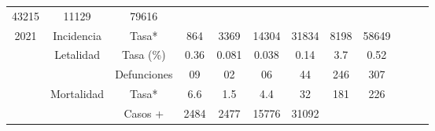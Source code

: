 \begin{tabular}{ccc|cccccc|lll}
		\multicolumn{1}{c|}{\cellcolor[HTML]{FFFC9E}43215} &
		\multicolumn{1}{c|}{\cellcolor[HTML]{FFFC9E}11129} &
		\cellcolor[HTML]{FFFC9E}79616 &
		&
		&
		\\ \cline{2-9}
		\multicolumn{1}{|c|}{\multirow{-5}{*}{\cellcolor[HTML]{FFFC9E}2021}} &
		\multicolumn{1}{c|}{\cellcolor[HTML]{FFFC9E}Incidencia} &
		\cellcolor[HTML]{FFFC9E}Tasa* &
		\multicolumn{1}{c|}{\cellcolor[HTML]{FFFC9E}864} &
		\multicolumn{1}{c|}{\cellcolor[HTML]{FFFC9E}3369} &
		\multicolumn{1}{c|}{\cellcolor[HTML]{FFFC9E}14304} &
		\multicolumn{1}{c|}{\cellcolor[HTML]{FFFC9E}31834} &
		\multicolumn{1}{c|}{\cellcolor[HTML]{FFFC9E}8198} &
		\cellcolor[HTML]{FFFC9E}58649 &
		&
		&
		\\ \cline{1-9}
		\multicolumn{1}{|c|}{\cellcolor[HTML]{C1EFC0}} &
		\multicolumn{1}{c|}{\cellcolor[HTML]{C1EFC0}Letalidad} &
		\cellcolor[HTML]{C1EFC0}Tasa (\%) &
		\multicolumn{1}{c|}{\cellcolor[HTML]{C1EFC0}0.36} &
		\multicolumn{1}{c|}{\cellcolor[HTML]{C1EFC0}0.081} &
		\multicolumn{1}{c|}{\cellcolor[HTML]{C1EFC0}0.038} &
		\multicolumn{1}{c|}{\cellcolor[HTML]{C1EFC0}0.14} &
		\multicolumn{1}{c|}{\cellcolor[HTML]{C1EFC0}3.7} &
		\cellcolor[HTML]{C1EFC0}0.52 &
		&
		&
		\\ \cline{3-9}
		\multicolumn{1}{|c|}{\cellcolor[HTML]{C1EFC0}} &
		\multicolumn{1}{c|}{\cellcolor[HTML]{C1EFC0}} &
		\cellcolor[HTML]{C1EFC0}Defunciones &
		\multicolumn{1}{c|}{\cellcolor[HTML]{C1EFC0}09} &
		\multicolumn{1}{c|}{\cellcolor[HTML]{C1EFC0}02} &
		\multicolumn{1}{c|}{\cellcolor[HTML]{C1EFC0}06} &
		\multicolumn{1}{c|}{\cellcolor[HTML]{C1EFC0}44} &
		\multicolumn{1}{c|}{\cellcolor[HTML]{C1EFC0}246} &
		\cellcolor[HTML]{C1EFC0}307 &
		&
		&
		\\ \cline{3-9}
		\multicolumn{1}{|c|}{\cellcolor[HTML]{C1EFC0}} &
		\multicolumn{1}{c|}{\cellcolor[HTML]{C1EFC0}Mortalidad} &
		\cellcolor[HTML]{C1EFC0}Tasa* &
		\multicolumn{1}{c|}{\cellcolor[HTML]{C1EFC0}6.6} &
		\multicolumn{1}{c|}{\cellcolor[HTML]{C1EFC0}1.5} &
		\multicolumn{1}{c|}{\cellcolor[HTML]{C1EFC0}4.4} &
		\multicolumn{1}{c|}{\cellcolor[HTML]{C1EFC0}32} &
		\multicolumn{1}{c|}{\cellcolor[HTML]{C1EFC0}181} &
		\cellcolor[HTML]{C1EFC0}226 &
		&
		&
		\\ \cline{3-9}
		\multicolumn{1}{|c|}{\cellcolor[HTML]{C1EFC0}} &
		\multicolumn{1}{c|}{\cellcolor[HTML]{C1EFC0}} &
		\cellcolor[HTML]{C1EFC0}Casos + &
		\multicolumn{1}{c|}{\cellcolor[HTML]{C1EFC0}2484} &
		\multicolumn{1}{c|}{\cellcolor[HTML]{C1EFC0}2477} &
		\multicolumn{1}{c|}{\cellcolor[HTML]{C1EFC0}15776} &
		\multicolumn{1}{c|}{\cellcolor[HTML]{C1EFC0}31092} &

\end{tabular}
